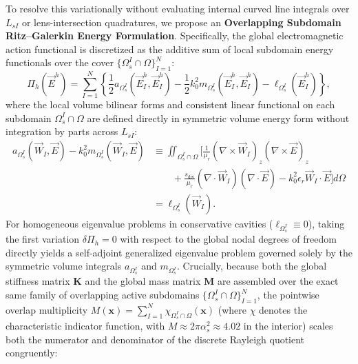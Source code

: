 \documentclass[preprint,12pt]{elsarticle}
\begin{document}
To resolve this variationally without evaluating internal curved line integrals over $L_{sI}$ or lens-intersection quadratures, we propose an \textbf{Overlapping Subdomain Ritz--Galerkin Energy Formulation}. Specifically, the global electromagnetic action functional is discretized as the additive sum of local subdomain energy functionals over the cover $\{\Omega_s^I \cap \Omega\}_{I=1}^N$:
\begin{equation}
    \Pi_h(\vec{E}^h) = \sum_{I=1}^N \left\{ \frac{1}{2} a_{\Omega_s^I}(\vec{E}_I^h, \vec{E}_I^h) - \frac{1}{2} k_0^2 m_{\Omega_s^I}(\vec{E}_I^h, \vec{E}_I^h) - \ell_{\Omega_s^I}(\vec{E}_I^h) \right\},
\end{equation}
where the local volume bilinear forms and consistent linear functional on each subdomain $\Omega_s^I \cap \Omega$ are defined directly in symmetric volume energy form without integration by parts across $L_{sI}$:
\begin{equation}
    \begin{aligned}
        a_{\Omega_s^I}(\vec{W}_I, \vec{E}) - k_0^2 m_{\Omega_s^I}(\vec{W}_I, \vec{E}) & \equiv \iint_{\Omega_s^I \cap \Omega} \bigg[ \frac{1}{\mu_r} (\nabla \times \vec{W}_I)_z (\nabla \times \vec{E})_z \\
                                                                                      & \qquad + \frac{s_{\mathrm{div}}}{\mu_r} (\nabla \cdot \vec{W}_I) (\nabla \cdot \vec{E}) - k_0^2 \epsilon_r \vec{W}_I \cdot \vec{E} \bigg] d\Omega \\
                                                                                      & = \ell_{\Omega_s^I}(\vec{W}_I).
    \end{aligned}
    \label{eq:volume_energy_form}
\end{equation}
For homogeneous eigenvalue problems in conservative cavities ($\ell_{\Omega_s^I} \equiv 0$), taking the first variation $\delta \Pi_h = 0$ with respect to the global nodal degrees of freedom directly yields a self-adjoint generalized eigenvalue problem governed solely by the symmetric volume integrals $a_{\Omega_s^I}$ and $m_{\Omega_s^I}$. Crucially, because both the global stiffness matrix $\mathbf{K}$ and the global mass matrix $\mathbf{M}$ are assembled over the exact same family of overlapping active subdomains $\{\Omega_s^I \cap \Omega\}_{I=1}^N$, the pointwise overlap multiplicity $M(\mathbf{x}) = \sum_{I=1}^N \chi_{\Omega_s^I \cap \Omega}(\mathbf{x})$ (where $\chi$ denotes the characteristic indicator function, with $M \approx 2\pi \alpha_s^2 \approx 4.02$ in the interior) scales both the numerator and denominator of the discrete Rayleigh quotient congruently:
\end{document}
